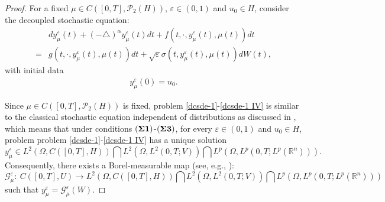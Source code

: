 \documentclass[11pt]{article}
\numberwithin{equation}{section}
\theoremstyle{plain}
\begin{document}
 \begin{proof}
    For a fixed $\mu\in
    C([0,T], \mathcal{P}_2(H))$,
    $\varepsilon \in (0,1)$
    and $u_0\in H$,
    consider the
    decoupled stochastic equation:
    \begin{align} \label{dcsde-1}
        & d y_\mu ^\varepsilon(t) + (-\triangle)^\alpha y_\mu^\varepsilon(t) dt
        + f(t, \cdot,  y_\mu^\varepsilon (t), \mu (t) ) dt
        \nonumber \\
        = & g(t, \cdot, y_\mu^\varepsilon (t), \mu (t) ) dt
        + \sqrt{\varepsilon}
        \sigma(t, y_\mu^\varepsilon (t), \mu (t) ) dW(t),
    \end{align}
    with initial data
    \begin{align} \label{dcsde-1 IV}
        y_\mu ^\varepsilon(0) = u_0.
    \end{align}

    Since
    $\mu\in
    C([0,T], \mathcal{P}_2(H))$
is fixed, problem
    \eqref{dcsde-1}-\eqref{dcsde-1 IV}
    is similar to the classical
    stochastic equation independent of
    distributions as discussed in
    \cite{wangb2019JDE}, which means that
    under conditions
    $({\bf \Sigma 1})$-$({\bf \Sigma 3})$,
    for every
    $\varepsilon \in (0,1)$
    and $u_0\in H$, problem
    problem
    \eqref{dcsde-1}-\eqref{dcsde-1 IV}
    has a unique solution
    $$y_\mu^\varepsilon
    \in  L^2(\Omega, C([0,T], H) )
    \bigcap
    L^2(\Omega, L^2(0,T; V) )
    \bigcap
    L^p(\Omega, L^p(0,T; L^p(\mathbb{R}^n ) ) ).
    $$
    Consequently,
    there exists   a Borel-measurable map
    (see, e.g.,
    \cite[Theorem 3.6]{lszz2022PA}):
    {\small
        $$  \mathcal{G}
        _ \mu ^\varepsilon : \   C([0,T],U)
        \rightarrow
        L^2(\Omega, C([0,T], H) )
        \bigcap
        L^2(\Omega, L^2(0,T; V) )
        \bigcap
        L^p(\Omega, L^p(0,T; L^p(\mathbb{R}^n ) ) )
        $$
    }
    such that
    $y^\varepsilon_\mu=
    \mathcal{G}
    _ \mu ^\varepsilon (W)$.



\end{proof}
\end{document}
